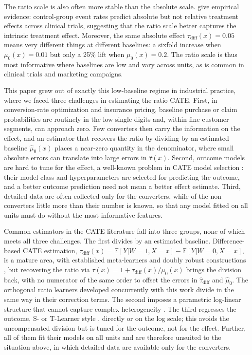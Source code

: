 \documentclass{article}
\begin{document}
The ratio scale is also often more stable than the absolute scale.
\citet{schmid1998} give empirical evidence: control-group event rates
predict absolute but not relative treatment effects across clinical
trials, suggesting that the ratio scale better captures the intrinsic
treatment effect. Moreover, the same absolute effect
$\tau_{\text{diff}}(x) = 0.05$ means very different things at
different baselines: a sixfold increase when $\mu_0(x) = 0.01$ but
only a 25\% lift when $\mu_0(x) = 0.2$. The ratio scale is thus most
informative where baselines are low and vary across units, as
is common in clinical trials and marketing campaigns.

This paper grew out of exactly this low-baseline regime in industrial
practice, where we faced three challenges in estimating the ratio CATE.
First, in conversion-rate optimization and insurance pricing, baseline
purchase or claim probabilities are routinely in the low single digits
and, within fine customer segments, can approach zero. Few converters
then carry the information on the effect, and an estimator that recovers
the ratio by dividing by an estimated baseline $\hat{\mu}_0(x)$ places a
near-zero quantity in the denominator, where small absolute errors can
translate into large errors in $\hat{\tau}(x)$. Second, outcome models are hard
to tune for the effect, a well-known problem in CATE model selection
\citep{schuler2018comparison, curth2023search}: their model class and hyperparameters are
selected for predicting the outcome, and a better outcome prediction
need not mean a better effect estimate. Third, detailed data are often
collected only for the converters, while of the non-converters little more
than their number is known, so that any model fitted on all units must do
without the most informative features.

Common estimators in the CATE literature fall into three groups, none of which meets all three
challenges. The first divides by an estimated baseline.
Difference-based CATE estimation,
$\tau_{\text{diff}}(x) = \mathbb{E}[Y|W{=}1,X{=}x] - \mathbb{E}[Y|W{=}0,X{=}x]$,
is a mature area, with established meta-learners
\citep{kunzel2019metalearners, nie2021quasi} and doubly robust
constructions \citep{kennedy2023optimal}, but recovering the ratio via
$\tau(x) = 1 + \tau_{\text{diff}}(x)/\mu_0(x)$ brings the division
back, with no numerator of the same order to offset the errors in
$\hat\tau_{\text{diff}}$ and $\hat\mu_0$. The orthogonal ratio learners
developed concurrently with this work \citep{ge2026orthogonal} divide
in the same way in their correction terms. The second imposes a
parametric log-linear structure that cannot capture complex
heterogeneity \citep{yadlowsky2021ratio, zou2004modified}. The third
regresses the outcome, S- or T-Learner style
\citep{kunzel2019metalearners}, directly or on the log scale; this
avoids the uncompensated division but is tuned for the outcome, not
for the effect. Further, all of them fit their models on all units and are
therefore unsuited to the situation above, in which detailed data are
available only for the converters.
\end{document}
